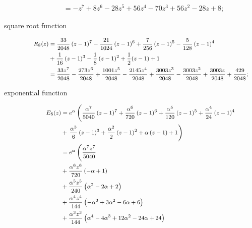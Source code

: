 \begin{description}
\begin{displaymath}
\begin{split}
                             &= - z^{7} + 8 z^{6} - 28 z^{5} + 56 z^{4} - 70 z^{3} + 56 z^{2} - 28 z + 8;
    \end{split}
\end{displaymath}
\item[square root function]
\begin{displaymath}
\footnotesize
    \begin{split}
        R_{8}{\left (z \right )}  &= \frac{33}{2048} \left(z - 1\right)^{7} - \frac{21}{1024} \left(z - 1\right)^{6} + \frac{7}{256} \left(z - 1\right)^{5} - \frac{5}{128} \left(z - 1\right)^{4}\\
                              &+ \frac{1}{16} \left(z - 1\right)^{3} - \frac{1}{8} \left(z - 1\right)^{2} + \frac{1}{2}(z-1) + 1 \\
                              &= \frac{33 z^{7}}{2048} - \frac{273 z^{6}}{2048} + \frac{1001 z^{5}}{2048} - \frac{2145 z^{4}}{2048} + \frac{3003 z^{3}}{2048} - \frac{3003 z^{2}}{2048} + \frac{3003 z}{2048} + \frac{429}{2048};
    \end{split}
\end{displaymath}
\item[exponential function]
\begin{equation}
\footnotesize
    \begin{split}
        E_{8}{\left (z \right )}    &= e^{\alpha} \left(\frac{\alpha^{7} }{5040} \left(z - 1\right)^{7} + \frac{\alpha^{6} }{720} \left(z - 1\right)^{6} + \frac{\alpha^{5} }{120} \left(z - 1\right)^{5} + \frac{\alpha^{4} }{24} \left(z - 1\right)^{4}\right.\\
                                &+ \left. \frac{\alpha^{3} }{6} \left(z - 1\right)^{3} + \frac{\alpha^{2} }{2} \left(z - 1\right)^{2} + \alpha \left(z - 1\right)  + 1\right)\\
                                &= e^{\alpha}\left(\frac{\alpha^{7} z^{7}}{5040}\right. \\
                                &+ \frac{\alpha^{6} z^{6}}{720} \left(- \alpha + 1\right) \\
                                &+ \frac{\alpha^{5} z^{5}}{240} \left(\alpha^{2} - 2 \alpha + 2\right) \\
                                &+ \frac{\alpha^{4} z^{4}}{144} \left(- \alpha^{3} + 3 \alpha^{2} - 6 \alpha + 6\right) \\
                                &+ \frac{\alpha^{3} z^{3}}{144} \left(\alpha^{4} - 4 \alpha^{3} + 12 \alpha^{2} - 24 \alpha + 24\right) \\

\end{split}
\end{equation}
\end{description}
